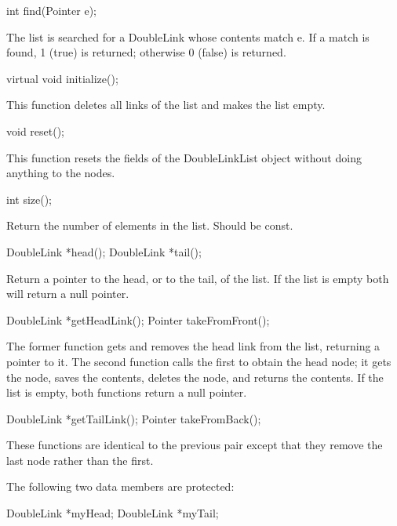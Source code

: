 \begin{example}
int find(Pointer e);
\end{example}

The list is searched for a DoubleLink whose contents match e.  If
a match is found, 1 (true) is returned; otherwise 0 (false) is
returned.

\begin{example}
virtual void initialize();
\end{example}

This function deletes all links of the list and makes the list empty.

\begin{example}
void reset();
\end{example}

This function resets the fields of the DoubleLinkList object without
doing anything to the nodes.

\begin{example}
int size();
\end{example}

Return the number of elements in the list.  Should be const.

\begin{example}
DoubleLink *head();
DoubleLink *tail();
\end{example}

Return a pointer to the head, or to the tail, of the list.  If
the list is empty both will return a null pointer.

\begin{example}
DoubleLink *getHeadLink();
Pointer takeFromFront();
\end{example}

The former function gets and removes the head link from the list,
returning a pointer to it.  The second function calls the first
to obtain the head node; it gets the node, saves the contents,
deletes the node, and returns the contents.  If the list is empty,
both functions return a null pointer.

\begin{example}
DoubleLink *getTailLink();
Pointer takeFromBack();
\end{example}

These functions are identical to the previous pair except that
they remove the last node rather than the first.

The following two data members are protected:

\begin{example}
DoubleLink *myHead;
DoubleLink *myTail;
\end{example}

